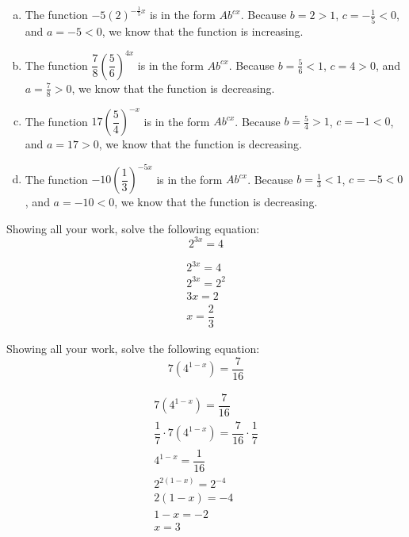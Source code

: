 \documentclass[11pt,letterpaper]{article}
\begin{document}
\sol
\begin{enumerate}[(a)]
\item The function $-5 \left( 2 \right)^{-\frac{1}{5} x}$ is in the form $Ab^{cx}$. Because $b= 2 > 1$, $c= -\frac{1}{5} < 0$, and $a= -5 < 0$, we know that the function is increasing. 

\item The function $\dfrac{7}{8} \left( \dfrac{5}{6} \right)^{4x}$ is in the form $Ab^{cx}$. Because $b= \frac{5}{6} < 1$, $c= 4 > 0$, and $a= \frac{7}{8} > 0$, we know that the function is decreasing. 

\item The function $17 \left( \dfrac{5}{4} \right)^{-x}$ is in the form $Ab^{cx}$. Because $b= \frac{5}{4} > 1$, $c= -1 < 0$, and $a= 17 > 0$, we know that the function is decreasing. 

\item The function $-10 \left( \dfrac{1}{3} \right)^{-5x}$ is in the form $Ab^{cx}$. Because $b= \frac{1}{3} < 1$, $c= -5 < 0$, and $a= -10 < 0$, we know that the function is decreasing. 
\end{enumerate}



\newpage



 Showing all your work, solve the following equation:
	\[
	2^{3x}= 4
	\] \pspace

\sol
	\begin{gather*}
	2^{3x}= 4 \\[0.3cm]
	2^{3x}= 2^2 \\[0.3cm]
	3x= 2 \\[0.3cm]
	x= \dfrac{2}{3}
	\end{gather*}



\newpage



 Showing all your work, solve the following equation:
	\[
	7(4^{1 - x})= \dfrac{7}{16}
	\] \pspace

\sol
	\begin{gather*}
	7(4^{1 - x})= \dfrac{7}{16} \\[0.3cm]
	\dfrac{1}{7} \cdot 7(4^{1 - x})= \dfrac{7}{16} \cdot \dfrac{1}{7} \\[0.3cm]
	4^{1 - x}= \dfrac{1}{16} \\[0.3cm]
	2^{2(1 - x)}= 2^{-4} \\[0.3cm]
	2(1 - x)= -4 \\[0.3cm]
	1 - x= -2 \\[0.3cm]
	x= 3
	\end{gather*}
\end{document}
